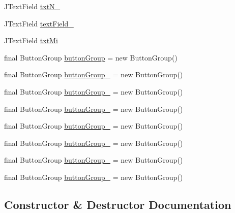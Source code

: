 \begin{DoxyCompactItemize}
\item 
J\+Text\+Field \hyperlink{classtrainModel_1_1trainModeUI_a145ab9a2bcc199aa2f33f7d9bb0d84d6}{txt\+N\+\_}
\item 
J\+Text\+Field \hyperlink{classtrainModel_1_1trainModeUI_a23053c176c8d26dfb31559c638873e12}{text\+Field\+\_}
\item 
J\+Text\+Field \hyperlink{classtrainModel_1_1trainModeUI_a1705d34b28dc270079c8d965f2d64aab}{txt\+Mi}
\item 
final Button\+Group \hyperlink{classtrainModel_1_1trainModeUI_a51a47187c73fde59eab68c64be9659a2}{button\+Group} = new Button\+Group()
\item 
final Button\+Group \hyperlink{classtrainModel_1_1trainModeUI_a5bb8829ce826608235046acb2eaa2412}{button\+Group\+\_} = new Button\+Group()
\item 
final Button\+Group \hyperlink{classtrainModel_1_1trainModeUI_a00aa346c55702462ecd81189215323dd}{button\+Group\+\_} = new Button\+Group()
\item 
final Button\+Group \hyperlink{classtrainModel_1_1trainModeUI_a32bcd5e2a96960256ff54f3d102b733c}{button\+Group\+\_} = new Button\+Group()
\item 
final Button\+Group \hyperlink{classtrainModel_1_1trainModeUI_a882be98e88b112093ba96d46c91ef28d}{button\+Group\+\_} = new Button\+Group()
\item 
final Button\+Group \hyperlink{classtrainModel_1_1trainModeUI_a673b745ab85682f23ef1e47d314ae7e2}{button\+Group\+\_} = new Button\+Group()
\item 
final Button\+Group \hyperlink{classtrainModel_1_1trainModeUI_a10b200816aff0e5040f44a619abe1230}{button\+Group\+\_} = new Button\+Group()
\item 
final Button\+Group \hyperlink{classtrainModel_1_1trainModeUI_a6515fdd149165f9e0ddf31cfba57d211}{button\+Group\+\_} = new Button\+Group()
\end{DoxyCompactItemize}


\subsection{Constructor \& Destructor Documentation}
\mbox{\label{classtrainModel_1_1trainModeUI_adcb73bee7b6c10d7fce3a924b2fe092a}} 
